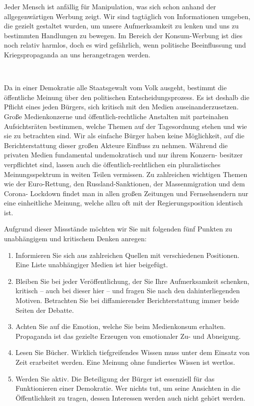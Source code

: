 \documentclass{agora_flyer_a5}
\begin{document}
\AgoraFlyerTitlePage
\sloppy


\begin{Intro}
Jeder Mensch ist anfällig für Manipulation, was sich schon
anhand der allgegenwärtigen Werbung zeigt. Wir sind tagtäglich
von Informationen umgeben, die gezielt gestaltet wurden, um
unsere Aufmerksamkeit zu lenken und uns zu bestimmten
Handlungen zu bewegen. Im Bereich der Konsum-Werbung ist
dies noch relativ harmlos, doch es wird gefährlich, wenn
politische Beeinflussung und Kriegspropaganda an uns
herangetragen werden.
\end{Intro}

\ 

Da in einer Demokratie alle Staatsgewalt vom Volk ausgeht,
bestimmt die öffentliche Meinung über den politischen
Entscheidungsprozess. Es ist deshalb die Pflicht eines jeden
Bürgers, sich kritisch mit den Medien auseinanderzusetzen. Große
Medienkonzerne und öffentlich-rechtliche Anstalten mit
parteinahen Aufsichtsräten bestimmen, welche Themen auf der
Tagesordnung stehen und wie sie zu betrachten sind. Wir als
einfache Bürger haben keine Möglichkeit, auf die Berichterstattung
dieser großen Akteure Einfluss zu nehmen. Während die privaten
Medien fundamental undemokratisch und nur ihrem Konzern-
besitzer verpflichtet sind, lassen auch die öffentlich-rechtlichen ein
pluralistisches Meinungsspektrum in weiten Teilen vermissen. Zu
zahlreichen wichtigen Themen wie der Euro-Rettung, den
Russland-Sanktionen, der Massenmigration und dem Corona-
Lockdown findet man in allen großen Zeitungen und
Fernsehsendern nur eine einheitliche Meinung, welche allzu oft mit
der Regierungsposition identisch ist.

Aufgrund dieser Missstände möchten wir Sie mit folgenden fünf
Punkten zu unabhängigem und kritischem Denken anregen:

\begin{enumerate}
    \item Informieren Sie sich aus zahlreichen Quellen mit verschiedenen
          Positionen. Eine Liste unabhängiger Medien ist hier beigefügt.
    \item Bleiben Sie bei jeder Veröffentlichung, der Sie Ihre
          Aufmerksamkeit schenken, kritisch – auch bei dieser hier – und
          fragen Sie nach den dahinterliegenden Motiven. Betrachten Sie
          bei diffamierender Berichterstattung immer beide Seiten der
          Debatte.
    \item Achten Sie auf die Emotion, welche Sie beim Medienkonsum
          erhalten. Propaganda ist das gezielte Erzeugen von emotionaler
          Zu- und Abneigung.
    \item Lesen Sie Bücher. Wirklich tiefgreifendes Wissen muss unter
          dem Einsatz von Zeit erarbeitet werden. Eine Meinung ohne
          fundiertes Wissen ist wertlos.
    \item Werden Sie aktiv. Die Beteiligung der Bürger ist essenziell für
          das Funktionieren einer Demokratie. Wer nichts tut, um seine
          Ansichten in die Öffentlichkeit zu tragen, dessen Interessen
          werden auch nicht gehört werden.
\end{enumerate}
\end{document}
